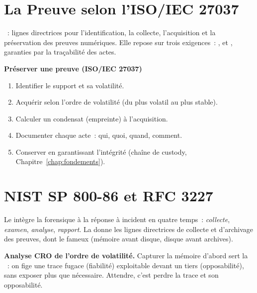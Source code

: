 \section{La Preuve selon l'ISO/IEC 27037}
\label{sec:c08-27037}

\begin{boxdef}
~: lignes directrices pour l'identification, la
collecte, l'acquisition et la préservation des preuves numériques. Elle
repose sur trois exigences~: ,  et
, garanties par la traçabilité des actes.
\end{boxdef}

\begin{boxprocedure}
\textbf{Préserver une preuve (ISO/IEC 27037)}
\begin{enumerate}
    \item Identifier le support et sa volatilité.
    \item Acquérir selon l'ordre de volatilité (du plus volatil au plus
          stable).
    \item Calculer un condensat (empreinte) à l'acquisition.
    \item Documenter chaque acte~: qui, quoi, quand, comment.
    \item Conserver en garantissant l'intégrité (chaîne de custody,
          Chapitre~\ref{chap:fondements}).
\end{enumerate}
\end{boxprocedure}

\section{NIST SP 800-86 et RFC 3227}
\label{sec:c08-nist}

Le  intègre la forensique à la réponse à incident en
quatre temps~: \emph{collecte}, \emph{examen}, \emph{analyse},
\emph{rapport}. La  donne les lignes directrices de
collecte et d'archivage des preuves, dont le fameux  (mémoire avant disque, disque avant archives).

\begin{boxCRO}
\textbf{Analyse CRO de l'ordre de volatilité.} Capturer la mémoire d'abord
sert la ~: on fige une trace fugace (fiabilité) exploitable
devant un tiers (opposabilité), sans exposer plus que nécessaire. Attendre,
c'est perdre la trace et son opposabilité.
\end{boxCRO}

